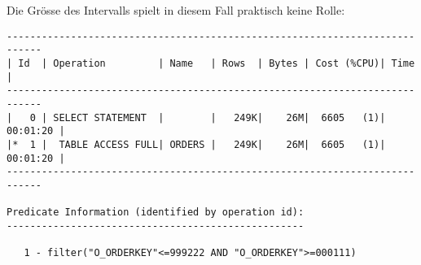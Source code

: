 \documentclass[11pt,a4paper,parskip=half]{scrartcl}
\begin{document}
Die Grösse des Intervalls spielt in diesem Fall praktisch keine Rolle:
\begin{lstlisting}
----------------------------------------------------------------------------                                                                                                                                                                                                                                 
| Id  | Operation         | Name   | Rows  | Bytes | Cost (%CPU)| Time     |                                                                                                                                                                                                                                 
----------------------------------------------------------------------------                                                                                                                                                                                                                                 
|   0 | SELECT STATEMENT  |        |   249K|    26M|  6605   (1)| 00:01:20 |                                                                                                                                                                                                                                 
|*  1 |  TABLE ACCESS FULL| ORDERS |   249K|    26M|  6605   (1)| 00:01:20 |                                                                                                                                                                                                                                 
----------------------------------------------------------------------------                                                                                                                                                                                                                                 
                                                                                                                                                                                                                                                                                                             
Predicate Information (identified by operation id):                                                                                                                                                                                                                                                          
---------------------------------------------------                                                                                                                                                                                                                                                          
                                                                                                                                                                                                                                                                                                             
   1 - filter("O_ORDERKEY"<=999222 AND "O_ORDERKEY">=000111)  
\end{lstlisting}
\end{document}
